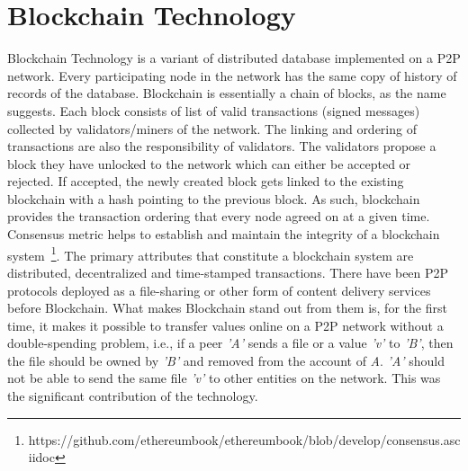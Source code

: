
\section{Blockchain Technology} \label{sec:blockchain}
Blockchain Technology is a variant of distributed database implemented on a P2P
network. Every participating node in the network has the same copy of history
of records of the database. Blockchain is essentially a chain of blocks, as the
name suggests. Each block consists of list of valid transactions (signed
messages) collected by validators/miners of the network. The linking and
ordering of transactions are also the responsibility of validators. The
validators propose a block they have unlocked to the network which can either
be accepted or rejected. If accepted, the newly created block gets linked to
the existing blockchain with a hash pointing to the previous block. As such,
blockchain provides the transaction ordering that every node agreed on at a
given time. Consensus metric helps to establish and maintain the integrity of a
blockchain
system~\footnote{https://github.com/ethereumbook/ethereumbook/blob/develop/consensus.asciidoc}.
The primary attributes that constitute a blockchain system are distributed,
decentralized and time-stamped transactions.  There have been P2P protocols
deployed as a file-sharing or other form of content delivery services before
Blockchain. What makes Blockchain stand out from them is, for the first time,
it makes it possible to transfer values online on a P2P network without a
double-spending problem, i.e., if a peer \textit{'A'} sends a file or a value
\textit{'v'} to \textit{'B'}, then the file should be owned by \textit{'B'} and
removed from the account of \textit{A}. \textit{'A'} should not be able to send
the same file \textit{'v'} to other entities on the network. This was the
significant contribution of the technology. 



